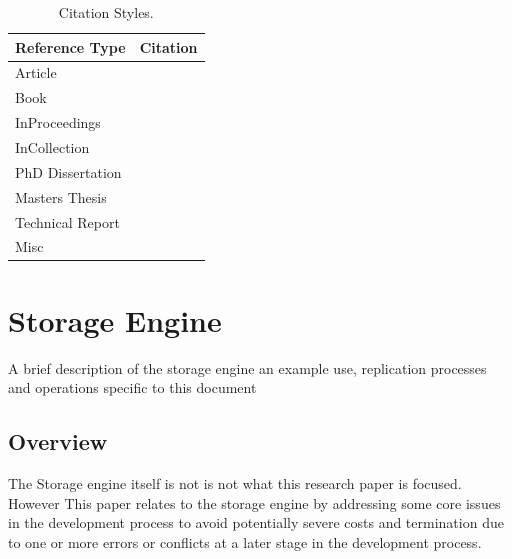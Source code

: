 \documentclass[11pt,a4paper,oneside]{book} %
\numberwithin{equation}{section}
\begin{document}
\begin{table}[!th]
\centering


\begin{tabular}{|p{3cm}|p{9cm}|}
\hline
\textbf{Reference Type} & \textbf{Citation}\\ \hline
Article & \cite{Hayes1993}\\ \hline
Book & \cite[p.127-133]{Lamport_2005}\\ \hline
InProceedings & \cite*{Nicholls_1987}\\ \hline
InCollection & \cite{Lund_2019}\\ \hline
PhD Dissertation & \cite{Konnov_2019}\\ \hline
Masters Thesis & \cite{Lamport_2005}\\ \hline
Technical Report & \cite{Engberg1993}\\ \hline
Misc & \cite{Hayes1993}\\ \hline
\end{tabular}
\caption{Citation Styles.}
\label{t-References}
\end{table}


\chapter{Storage Engine}
A brief description of the storage engine an example use, replication processes and operations specific to this document

\section{Overview}
The Storage engine itself is not is not what this research paper is focused. However This paper relates to the storage engine by addressing some core issues in the development process to avoid potentially severe costs and termination due to one or more errors or conflicts at a later stage in the development process. 
\end{document}
